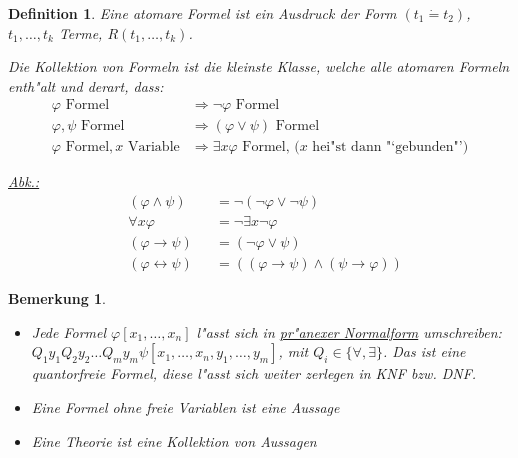 \documentclass[a4paper,12pt,numbers=noenddot,parskip=full]{scrartcl}
\theoremstyle{dotless}
\newtheorem{definition}[theorem]{Definition}
\newtheorem{remark}[theorem]{Bemerkung}
\begin{document}
\begin{definition}
	Eine atomare Formel ist ein Ausdruck der Form $(t_1 \dot= t_2)$, $t_1, \dots, t_k$ Terme, $R(t_1, \dots, t_k)$.
	
	Die Kollektion von Formeln ist die kleinste Klasse, welche alle atomaren Formeln enth"alt und derart, dass:
	\begin{align*}
		\varphi \text{ Formel} &\Longrightarrow \lnot \varphi \text{ Formel}\\
		\varphi, \psi \text{ Formel} &\Longrightarrow (\varphi \lor \psi) \text{ Formel}\\
		\varphi \text{ Formel}, x \text{ Variable} &\Longrightarrow \exists x \varphi \text{ Formel, ($x$ hei"st dann "`gebunden"')}
	\end{align*}
	
	\underline{Abk.:} \begin{align*}
		&(\varphi \land \psi) &&= \lnot(\lnot\varphi\lor\lnot\psi)\\
		&\forall x \varphi &&= \lnot \exists x \lnot \varphi\\
		&(\varphi \rightarrow \psi) &&= (\lnot \varphi \lor \psi)\\
		&(\varphi \leftrightarrow \psi) &&= ((\varphi \rightarrow \psi) \land (\psi \rightarrow \varphi))
	\end{align*}
\end{definition}

\begin{remark}
	
	\begin{itemize}
		\item Jede Formel $\varphi [x_1, \dots, x_n]$ l"asst sich in \underline{pr"anexer Normalform} umschreiben:	
		$Q_1 y_1 Q_2 y_2 \dots Q_m y_m \psi [x_1, \dots, x_n, y_1, \dots, y_m]$, mit $Q_i \in \{\forall, \exists\}$. Das ist eine quantorfreie Formel, diese l"asst sich weiter zerlegen in KNF bzw. DNF.
		\item Eine Formel ohne freie Variablen ist eine Aussage
		\item Eine Theorie ist eine Kollektion von Aussagen
	\end{itemize}
\end{remark}
\end{document}

